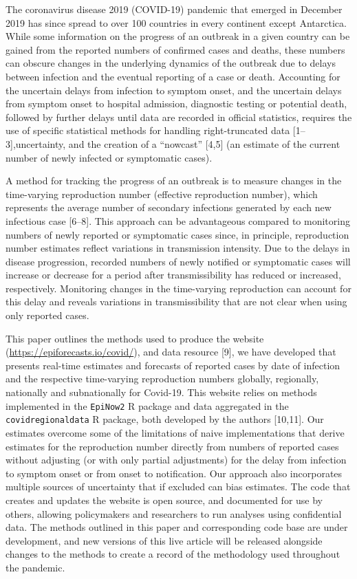 \documentclass[
]{article}
\begin{document}
The coronavirus disease 2019 (COVID-19) pandemic that emerged in
December 2019 has since spread to over 100 countries in every continent
except Antarctica. While some information on the progress of an outbreak
in a given country can be gained from the reported numbers of confirmed
cases and deaths, these numbers can obscure changes in the underlying
dynamics of the outbreak due to delays between infection and the
eventual reporting of a case or death. Accounting for the uncertain
delays from infection to symptom onset, and the uncertain delays from
symptom onset to hospital admission, diagnostic testing or potential
death, followed by further delays until data are recorded in official
statistics, requires the use of specific statistical methods for
handling right-truncated data {[}1--3{]},uncertainty, and the creation
of a ``nowcast'' {[}4,5{]} (an estimate of the current number of newly
infected or symptomatic cases).

A method for tracking the progress of an outbreak is to measure changes
in the time-varying reproduction number (effective reproduction number),
which represents the average number of secondary infections generated by
each new infectious case {[}6--8{]}. This approach can be advantageous
compared to monitoring numbers of newly reported or symptomatic cases
since, in principle, reproduction number estimates reflect variations in
transmission intensity. Due to the delays in disease progression,
recorded numbers of newly notified or symptomatic cases will increase or
decrease for a period after transmissibility has reduced or increased,
respectively. Monitoring changes in the time-varying reproduction can
account for this delay and reveals variations in transmissibility that
are not clear when using only reported cases.

This paper outlines the methods used to produce the website
(\url{https://epiforecasts.io/covid/}), and data resource {[}9{]}, we
have developed that presents real-time estimates and forecasts of
reported cases by date of infection and the respective time-varying
reproduction numbers globally, regionally, nationally and subnationally
for Covid-19. This website relies on methods implemented in the
\texttt{EpiNow2} R package and data aggregated in the
\texttt{covidregionaldata} R package, both developed by the authors
{[}10,11{]}. Our estimates overcome some of the limitations of naive
implementations that derive estimates for the reproduction number
directly from numbers of reported cases without adjusting (or with only
partial adjustments) for the delay from infection to symptom onset or
from onset to notification. Our approach also incorporates multiple
sources of uncertainty that if excluded can bias estimates. The code
that creates and updates the website is open source, and documented for
use by others, allowing policymakers and researchers to run analyses
using confidential data. The methods outlined in this paper and
corresponding code base are under development, and new versions of this
live article will be released alongside changes to the methods to create
a record of the methodology used throughout the pandemic.
\end{document}
